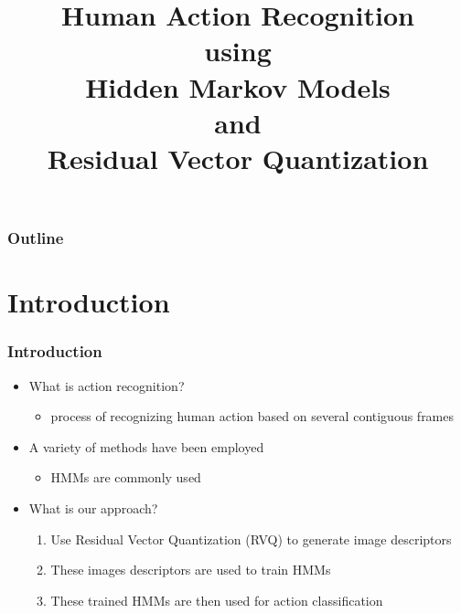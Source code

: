 



\title{Human Action Recognition\\ using \\Hidden Markov Models \\and \\Residual Vector Quantization}
\begin{frame}[plain]
\logoTechTower
	\titlepage
\end{frame}

\begin{frame}
\frametitle{Outline}
\logoTechTower
	\tableofcontents
\end{frame}

\section{Introduction}
\begin{frame}
\frametitle{Introduction}
\logoCSIPCPL
	\begin{itemize}
		\item What is {\color{red}action recognition}?
			\begin{itemize}
				\item process of recognizing human action based on several contiguous frames
			\end{itemize}
		\item A variety of methods have been employed
			\begin{itemize}
				\item HMMs are commonly used
			\end{itemize}
		\item What is {\color{red}our approach}?
			\begin{enumerate}
				\item Use Residual Vector Quantization (RVQ) to generate image descriptors 
				\item These images descriptors are used to train HMMs
				\item These trained HMMs are then used for action classification
			\end{enumerate}
	\end{itemize}
\end{frame}


